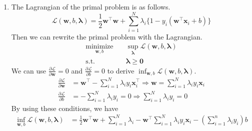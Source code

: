\documentclass[11pt]{article}
\begin{document}
\begin{enumerate}
\begin{enumerate}
\begin{proof}
    $\Rightarrow)\ \forall x,y\in\operatorname{dom}(f),$
    \begin{align*}
    f'(x)(y-x) &= f(x)+f'(x)(y-x)-f(x) \\
    &\le f(y)-f(x) \\
    &\le f(y)-(f(y)+f'(y)(x-y)) \\
    &= f'(y)(y-x)
    \end{align*}
    Thus, we have
    \begin{align*}
    f''(x) &= \lim_{y\to x}\frac{f'(y)-f'(x)}{y-x} \\
    &= \lim_{y\to x}\frac{(f'(y)-f'(x))(y-x)}{(y-x)^2} \\
    &\ge 0
    \end{align*}
    $\Leftarrow)$ By the mean value version of the Taylor's theorem,
    \[\forall x,y\in\operatorname{dom}(f),\ \exists z\in[x,y] \text{\quad s.t.\quad} f(y)=f(x)+f'(x)(y-x)+\frac{1}{2}f''(z)(y-x)^{2}\]
    Since $f''(z)\ge 0$, we can get
    \[f(y) \ge f(x)+f'(x)(y-x)\]
    Thus, $f$ is convex iff $\forall z\in\operatorname{dom}(f),\ f''(z)\ge 0$.
    \end{proof}
\end{enumerate}
\item
    The Lagrangian of the primal problem is as follows.
    \[\mathcal{L}(\bm w,b,\bm\lambda)=\frac{1}{2}\bm w^{\top}\bm w+\sum_{i=1}^{N}\lambda_{i}\{1-y_{i}(\bm w^{\top}\bm x_{i}+b)\}\]
    Then we can rewrite the primal problem with the Lagrangian.
    \begin{align*}
    \underset{\bm w,b}{\operatorname{minimize}}\quad & \sup_{\bm\lambda}\mathcal{L}(\bm w,b,\bm\lambda) \\
    \text{s.t.}\quad & \bm\lambda \ge \bm 0
    \end{align*}
    We can use $\frac{\partial\mathcal{L}}{\partial\bm w}=0$ and $\frac{\partial\mathcal{L}}{\partial b}=0$ to derive $\inf_{\bm w,b}\mathcal{L}(\bm w,b,\bm\lambda)$.
    \begin{align*}
    \frac{\partial\mathcal{L}}{\partial\bm w}
    &= \bm w^{\top}-\sum_{i=1}^{N}\lambda_{i}y_{i}\bm x_{i}^{\top}
    \Rightarrow \bm w=\sum_{i=1}^{N}\lambda_{i}y_{i}\bm x_{i} \\
    \frac{\partial\mathcal{L}}{\partial b}
    &= -\sum_{i=1}^{N}\lambda_{i}y_{i}=0
    \Rightarrow \sum_{i=1}^{N}\lambda_{i}y_{i}=0
    \end{align*}
    By using these conditions, we have
    \begin{align*}
    \inf_{\bm w,b}\mathcal{L}(\bm w,b,\bm\lambda)
    &= \frac{1}{2}\bm w^{\top}\bm w+\sum_{i=1}^{N}\lambda_{i}-\bm w^{\top}\sum_{i=1}^{N}\lambda_{i}y_{i}\bm x_{i}-\left(\sum_{i=1}^{n}\lambda_{i}y_{i}\right)\!b \\

\end{align*}
\end{enumerate}
\end{document}
